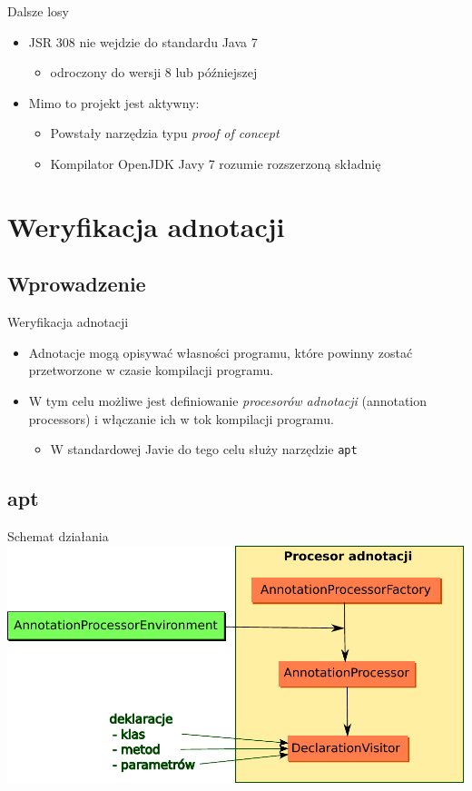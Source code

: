 \documentclass{beamer}
\begin{document}
\begin{frame}{Dalsze losy}
  \begin{itemize}
  \item<1-> JSR 308 nie wejdzie do standardu Java 7 
    \begin{itemize}
    \item odroczony do wersji 8 lub późniejszej
    \end{itemize}
  \item<2-> Mimo to projekt jest aktywny:
    \begin{itemize}
    \item Powstały narzędzia typu \emph{proof of concept}
    \item Kompilator OpenJDK Javy 7 rozumie rozszerzoną składnię
    \end{itemize}
  \end{itemize}
\end{frame}

\section{Weryfikacja adnotacji}
\subsection{Wprowadzenie}

\begin{frame}{Weryfikacja adnotacji}
\begin{itemize}
\item<1-> Adnotacje mogą opisywać własności programu, które powinny
  zostać przetworzone w czasie kompilacji programu.
\item<2-> W tym celu możliwe jest definiowanie \emph{procesorów
  adnotacji} (annotation processors) i włączanie ich w tok
  kompilacji programu.
  \begin{itemize}
  \item W standardowej Javie do tego celu służy narzędzie \texttt{apt}
  \end{itemize}
\end{itemize}
\end{frame}

\subsection{apt}

\begin{frame}{Schemat działania}
  \includegraphics[scale=0.55]{img/apt.pdf}
\end{frame}
\end{document}
